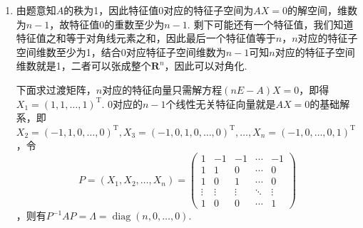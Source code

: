 \documentclass[UTF8,12pt,a4paper,fontset=fandol]{ctexart}
\begin{document}
\begin{solve}
\begin{enumerate}
                \item 由题意知$A$的秩为1，因此特征值0对应的特征子空间为$AX=0$的解空间，维数为$n-1$，故特征值0的重数至少为$n-1$. 剩下可能还有一个特征值，我们知道特征值之和等于对角线元素之和，因此最后一个特征值等于$n$，$n$对应的特征子空间维数至少为1，结合0对应特征子空间维数为$n-1$可知$n$对应的特征子空间维数就是1，二者可以张成整个$\mathbf{R}^n$，因此可以对角化.

                      下面求过渡矩阵，$n$对应的特征向量只需解方程$(nE-A)X=0$，即得$X_1=(1,1,\ldots,1)^\mathrm{T}$. 0对应的$n-1$个线性无关特征向量就是$AX=0$的基础解系，即$X_2=(-1,1,0,\ldots,0)^\mathrm{T},X_3=(-1,0,1,0,\ldots,0)^\mathrm{T},\ldots,X_n=(-1,0,\ldots,0,1)^\mathrm{T}$，令
\[P=(X_1,X_2,\ldots,X_n)=\begin{pmatrix}
                              1 & -1 & -1 & \cdots & -1 \\ 1 & 1 & 0 & \cdots & 0 \\ 1 & 0 & 1 & \cdots & 0 \\ \vdots & \vdots & \vdots & \ddots & \vdots \\ 1 & 0 & 0 & \cdots & 1
                          \end{pmatrix}\]
，则有$P^{-1}AP=\Lambda=\operatorname{diag}(n,0,\ldots,0)$.


\end{enumerate}
\end{solve}
\end{document}
